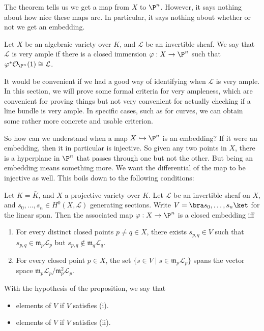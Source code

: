 \documentclass[a4paper]{article}
\begin{document}
The theorem tells us we get a map from $X$ to $\P^n$. However, it says nothing about how nice these maps are. In particular, it says nothing about whether or not we get an embedding.

\begin{defi}
  Let $X$ be an algebraic variety over $K$, and $\mathcal{L}$ be an invertible sheaf. We say that $\mathcal{L}$ is very ample if there is a closed immersion $\varphi: X \to \P^n$ such that $\varphi^* \mathcal{O}_{\P^n}(1) \cong \mathcal{L}$.
\end{defi}
It would be convenient if we had a good way of identifying when $\mathcal{L}$ is very ample. In this section, we will prove some formal criteria for very ampleness, which are convenient for proving things but not very convenient for actually checking if a line bundle is very ample. In specific cases, such as for curves, we can obtain some rather more concrete and usable criterion.

So how can we understand when a map $X \hookrightarrow \P^n$ is an embedding? If it were an embedding, then it in particular is injective. So given any two points in $X$, there is a hyperplane in $\P^n$ that passes through one but not the other. But being an embedding means something more. We want the differential of the map to be injective as well. This boils down to the following conditions:

\begin{prop}
  Let $K = \bar{K}$, and $X$ a projective variety over $K$. Let $\mathcal{L}$ be an invertible sheaf on $X$, and $s_0, \ldots, s_n \in H^0(X, \mathcal{L})$ generating sections. Write $V = \bra s_0, \ldots, s_n\ket$ for the linear span. Then the associated map $\varphi: X \to \P^n$ is a closed embedding iff
  \begin{enumerate}
    \item For every distinct closed points $p \not= q \in X$, there exists $s_{p, q} \in V$ such that $s_{p, q} \in \mathfrak{m}_p \mathcal{L}_p$ but $s_{p, q} \not \in \mathfrak{m}_q \mathcal{L}_q$.
    \item For every closed point $p \in X$, the set $\{s \in V \mid s \in \mathfrak{m}_p \mathcal{L}_p\}$ spans the vector space $\mathfrak{m}_p \mathcal{L}_p /\mathfrak{m}^2_p \mathcal{L}_p$.
  \end{enumerate}
\end{prop}

\begin{defi}
  With the hypothesis of the proposition, we say that
  \begin{itemize}
    \item elements of $V$  if $V$ satisfies (i).
    \item elements of $V$  if $V$ satisfies (ii).
  \end{itemize}
\end{defi}
\end{document}
